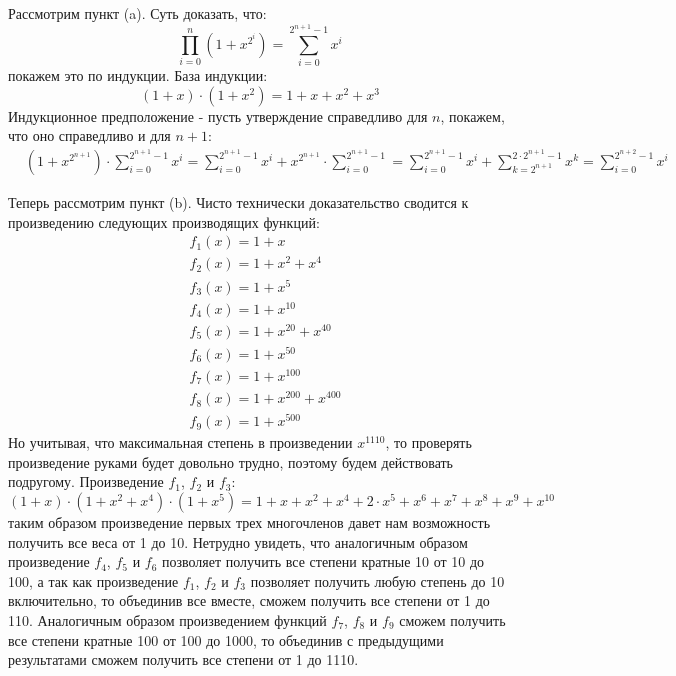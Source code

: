 \documentclass[a4paper,12pt]{article}
\begin{document}
\begin{Solution}
Рассмотрим пункт (a). Суть доказать, что:
\[
	\prod_{i=0}^{n}\left(1+x^{2^i}\right)=\sum_{i=0}^{2^{n+1}-1}x^i
\]
покажем это по индукции. База индукции:
\[
	\left(1+x\right)\cdot\left(1+x^2\right)=1+x+x^2+x^3
\]
Индукционное предположение - пусть утверждение справедливо для $n$, покажем, что оно справедливо и для $n+1$:
\[
	\begin{split}
		&\left(1+x^{2^{n+1}}\right)\cdot\sum_{i=0}^{2^{n+1}-1}x^i = \sum_{i=0}^{2^{n+1}-1}x^i + x^{2^{n+1}}\cdot\sum_{i=0}^{2^{n+1}-1} = \sum_{i=0}^{2^{n+1}-1}x^i+\sum_{k=2^{n+1}}^{2\cdot 2^{n+1}-1}x^k = \sum_{i=0}^{2^{n+2}-1}x^i
	\end{split}
\]

Теперь рассмотрим пункт (b). Чисто технически доказательство сводится к произведению следующих производящих функций:
\[
	\begin{split}
		&f_1\left(x\right) = 1+x\\
		&f_2\left(x\right) = 1+x^2+x^4\\
		&f_3\left(x\right) = 1+x^5\\
		&f_4\left(x\right) = 1+x^{10}\\
		&f_5\left(x\right) = 1+x^{20}+x^{40}\\
		&f_6\left(x\right) = 1+x^{50}\\
		&f_7\left(x\right) = 1+x^{100}\\
		&f_8\left(x\right) = 1+x^{200}+x^{400}\\
		&f_9\left(x\right) = 1+x^{500}
	\end{split}
\]
Но учитывая, что максимальная степень в произведении $x^{1110}$, то проверять произведение руками будет довольно трудно, поэтому будем действовать подругому.
Произведение $f_1$, $f_2$ и $f_3$:
\[
	\left(1+x\right)\cdot\left(1+x^2+x^4\right)\cdot\left(1+x^5\right) = 1+x+x^2+x^4+2\cdot x^5+x^6+x^7+x^8+x^9+x^{10}
\]
таким образом произведение первых трех многочленов давет нам возможность получить все веса от 1 до 10. Нетрудно увидеть, что аналогичным образом произведение $f_4$, $f_5$ и $f_6$ позволяет получить все степени кратные 10 от 10 до 100, а так как произведение $f_1$, $f_2$ и $f_3$ позволяет получить любую степень до 10 включительно, то объединив все вместе, сможем получить все степени от 1 до 110. Аналогичным образом произведением функций $f_7$, $f_8$ и $f_9$ сможем получить все степени кратные 100 от 100 до 1000, то объединив с предыдущими результатами сможем получить все степени от 1 до 1110.

\end{Solution}
\end{document}
